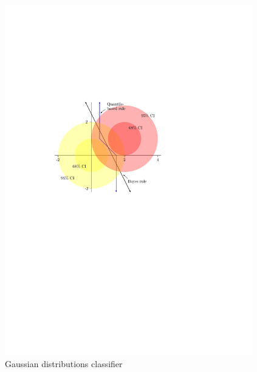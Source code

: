 \begin{figure}[ht]
  \caption{Gaussian distributions classifier}
  \label{fig:gaussian-classify}
  \centering
  \vspace{5mm}

  \begin{minipage}[t]{0.55\linewidth}
    \flushleft
    \includegraphics[width=0.96\textwidth]{gauss_ci}
  \end{minipage}
  \begin{minipage}[t]{0.44\linewidth}
    \flushright

\end{minipage}
\end{figure}
